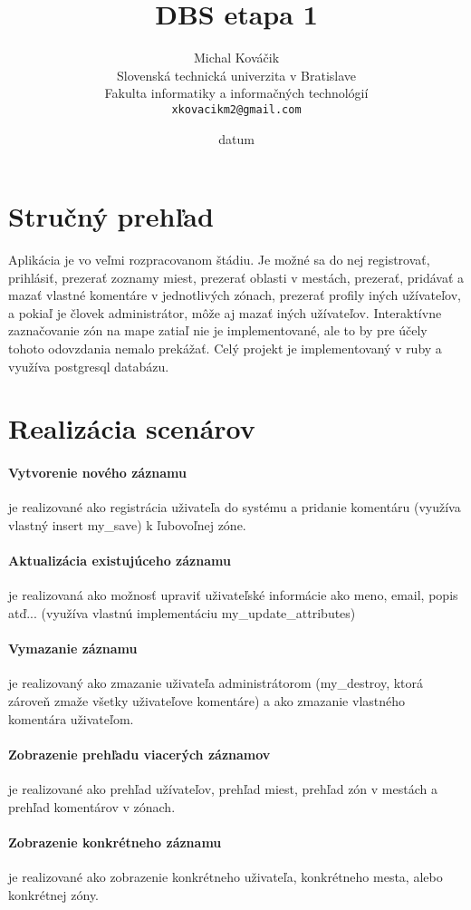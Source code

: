 \documentclass[12pt,oneside,slovak,a4paper]{article}
\title{DBS etapa 1}
\author{Michal Kováčik\\[2pt]
	{\small Slovenská technická univerzita v Bratislave}\\
	{\small Fakulta informatiky a informačných technológií}\\
	{\small \texttt{xkovacikm2@gmail.com}}
	}
\date{\small datum}
\begin{document}
\maketitle

\section{Stručný prehľad}
Aplikácia je vo veľmi rozpracovanom štádiu. Je možné sa do nej registrovať, prihlásiť, prezerať zoznamy miest, prezerať oblasti v mestách, prezerať, pridávať a mazať vlastné komentáre v jednotlivých zónach, prezerať profily iných užívateľov, a pokiaľ je človek administrátor, môže aj mazať iných užívateľov.
Interaktívne zaznačovanie zón na mape zatiaľ nie je implementované, ale to by pre účely tohoto odovzdania nemalo prekážať.
Celý projekt je implementovaný v ruby a využíva postgresql databázu.

\section{Realizácia scenárov}
\paragraph{Vytvorenie nového záznamu} je realizované ako registrácia uživateľa do systému a pridanie komentáru (využíva vlastný insert my\_save) k ľubovoľnej zóne.
\paragraph*{Aktualizácia existujúceho záznamu} je realizovaná ako možnosť upraviť uživateľské informácie ako meno, email, popis atď... (využíva vlastnú implementáciu my\_update\_attributes)
\paragraph{Vymazanie záznamu} je realizovaný ako zmazanie uživateľa administrátorom (my\_destroy, ktorá zároveň zmaže všetky uživateľove komentáre) a ako zmazanie vlastného komentára uživateľom.
\paragraph{Zobrazenie prehľadu viacerých záznamov} je realizované ako prehľad užívateľov, prehľad miest, prehľad zón v mestách a prehľad komentárov v zónach.
\paragraph{Zobrazenie konkrétneho záznamu} je realizované ako zobrazenie konkrétneho uživateľa, konkrétneho mesta, alebo konkrétnej zóny.
\end{document}
